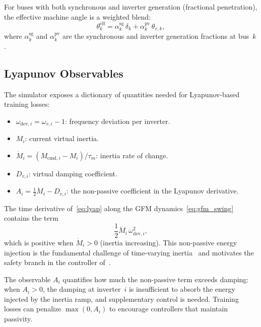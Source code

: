 \documentclass[11pt]{article}
\begin{document}
For buses with both synchronous and inverter generation (fractional
penetration), the effective machine angle is a weighted blend:
\begin{equation}
  \theta_k^{\mathrm{eff}} = \alpha_k^{\mathrm{sg}}\,\delta_k
    + \alpha_k^{\mathrm{pv}}\,\theta_{v,k},
  \label{eq:blended_angle}
\end{equation}
where $\alpha_k^{\mathrm{sg}}$ and $\alpha_k^{\mathrm{pv}}$ are the
synchronous and inverter generation fractions at bus~$k$.

\subsection{Lyapunov Observables}

The simulator exposes a dictionary of quantities needed for
Lyapunov-based training losses:
\begin{itemize}
\item $\omega_{\mathrm{dev},i} = \omega_{v,i} - 1$: frequency
  deviation per inverter.
\item $M_i$: current virtual inertia.
\item $\dot{M}_i = (M_{\mathrm{cmd},i} - M_i)/\tau_m$: inertia rate
  of change.
\item $D_{v,i}$: virtual damping coefficient.
\item $A_i = \tfrac{1}{2}\dot{M}_i - D_{v,i}$: the non-passive
  coefficient in the Lyapunov derivative.
\end{itemize}

The time derivative of~\eqref{eq:lyap} along the GFM
dynamics~\eqref{eq:gfm_swing} contains the term
\begin{equation}
  \frac{1}{2}\dot{M}_i\,\omega_{\mathrm{dev},i}^2,
  \label{eq:nonpassive}
\end{equation}
which is positive when $\dot{M}_i > 0$ (inertia increasing).  This
non-passive energy injection is the fundamental challenge of
time-varying inertia~\cite{Kasis20PrimaryFreq, Feng24VariableInertia}
and motivates the safety branch in the controller
of~\cite{AlduaijWeng25SGC}.

The observable $A_i$ quantifies how much the non-passive term exceeds
damping: when $A_i > 0$, the damping at inverter~$i$ is insufficient
to absorb the energy injected by the inertia ramp, and supplementary
control is needed.  Training losses can penalize $\max(0, A_i)$ to
encourage controllers that maintain passivity.

\end{document}
